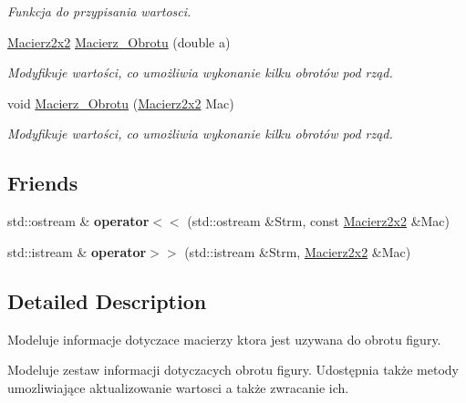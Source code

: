 \begin{DoxyCompactItemize}
\begin{DoxyCompactList}\small\item\em Funkcja do przypisania wartosci. \end{DoxyCompactList}\item 
\hyperlink{class_macierz2x2}{Macierz2x2} \hyperlink{class_macierz2x2_a45c8b9edd58833a97921fcb069045a62}{Macierz\+\_\+\+Obrotu} (double a)
\begin{DoxyCompactList}\small\item\em Modyfikuje wartości, co umożliwia wykonanie kilku obrotów pod rząd. \end{DoxyCompactList}\item 
void \hyperlink{class_macierz2x2_ad5117b3026d9cdc4c697d6de7d3a8f4f}{Macierz\+\_\+\+Obrotu} (\hyperlink{class_macierz2x2}{Macierz2x2} Mac)
\begin{DoxyCompactList}\small\item\em Modyfikuje wartości, co umożliwia wykonanie kilku obrotów pod rząd. \end{DoxyCompactList}\end{DoxyCompactItemize}
\subsection*{Friends}
\begin{DoxyCompactItemize}
\item 
\hypertarget{class_macierz2x2_aa3eba72acf9e09b901351ce2bc5edf2f}{std\+::ostream \& {\bfseries operator$<$$<$} (std\+::ostream \&Strm, const \hyperlink{class_macierz2x2}{Macierz2x2} \&Mac)}\label{class_macierz2x2_aa3eba72acf9e09b901351ce2bc5edf2f}

\item 
\hypertarget{class_macierz2x2_a41b60a94bb9873f185ec2fe49b19eed4}{std\+::istream \& {\bfseries operator$>$$>$} (std\+::istream \&Strm, \hyperlink{class_macierz2x2}{Macierz2x2} \&Mac)}\label{class_macierz2x2_a41b60a94bb9873f185ec2fe49b19eed4}

\end{DoxyCompactItemize}


\subsection{Detailed Description}
Modeluje informacje dotyczace macierzy ktora jest uzywana do obrotu figury. 

Modeluje zestaw informacji dotyczacych obrotu figury. Udostępnia także metody umozliwiające aktualizowanie wartosci a także zwracanie ich. 


